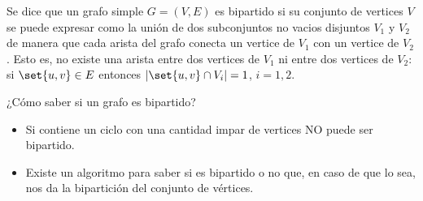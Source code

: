 \begin{definition}
	Se dice que un grafo simple \(G = (V,E )\) es bipartido si su conjunto de vertices \(V \) se puede expresar como la unión de dos subconjuntos no vacios disjuntos \(V_1 \) y \(V_2\) de manera que cada arista del grafo conecta un vertice de \(V_1 \) con un vertice de \(V_2 \). Esto es, no existe una arista entre dos vertices de \(V_1 \) ni entre dos vertices de \(V_2 \): si \(\set{u,v} \in E \) entonces \(|\set{u,v} \cap V_i | = 1\), \(i = 1,2\).
\end{definition}
\begin{center}
\end{center}

¿Cómo saber si un grafo es bipartido?
\begin{itemize}
	\item Si contiene un ciclo con una cantidad impar de vertices NO puede ser bipartido.
	\item Existe un algoritmo para saber si es bipartido o no que, en caso de que lo sea, nos da la bipartición del conjunto de vértices.
\end{itemize}

